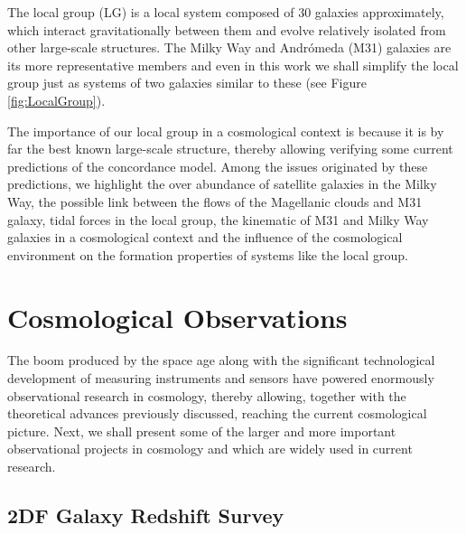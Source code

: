 The local group (LG) is a local system composed of 30 galaxies approximately, 
which interact gravitationally between them and evolve relatively isolated 
from other large-scale structures. The Milky Way and Andrómeda (M31) 
galaxies are its more representative members and even in this work we shall 
simplify the local group just as systems of two galaxies similar to these 
(see Figure \ref{fig:LocalGroup}).


The importance of our local group in a cosmological context is because it
is by far the best known large-scale structure, thereby allowing verifying
some current predictions of the concordance model. Among the issues 
originated by these predictions, we highlight the over abundance of 
satellite galaxies in the Milky Way, the possible link between the flows
of the Magellanic clouds and M31 galaxy, tidal forces in the local group,
the kinematic of M31 and Milky Way galaxies in a cosmological context 
\cite{forero2013} and the influence of the cosmological environment on the
formation properties of systems like the local group.








\section{Cosmological Observations}
\label{sec:CosmologicalObservations}
	
	
The boom produced by the space age along with the significant 
technological development of measuring instruments and sensors have 
powered enormously observational research in cosmology, thereby allowing, 
together with the theoretical advances previously discussed, reaching the 
current cosmological picture. Next, we shall present some of the larger
and more important observational projects in cosmology and which are 
widely used in current research.



	\subsection*{2DF Galaxy Redshift Survey}
	\label{subsec:2DFGRS}
	
